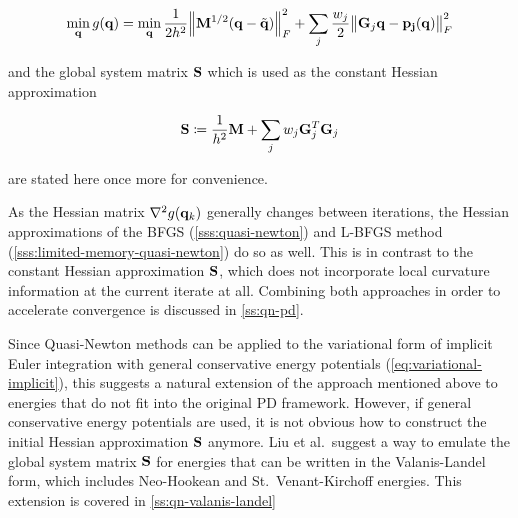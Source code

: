 \begin{equation}\label{eq:pd-minimization-q2}
    \min_{\mathbf{q}} g(\mathbf{q}) = 
    \min_{\mathbf{q}} \frac{1}{2h^2} \norm{\mathbf{M}^{1/2}(\mathbf{q} - \tilde{\mathbf{q}})}^2_F + \sum_j \frac{w_j}{2} \norm{\mathbf{G}_j\mathbf{q}
    - \mathbf{p_j}(\mathbf{q})}^2_F
\end{equation}

\noindent and the global system matrix $\mathbf{S}$ which is used as the constant Hessian approximation

\begin{equation}\label{eq:global-matrix}
    \mathbf{S} \coloneqq \frac{1}{h^2}\mathbf{M} + \sum_j w_j \mathbf{G}_j^T \mathbf{G}_j  
\end{equation}

\noindent are stated here once more for convenience.

As the Hessian matrix $\nabla^2 g(\mathbf{q}_k)$ generally changes between iterations, the Hessian approximations of the 
BFGS (\cref{sss:quasi-newton}) and L-BFGS method (\cref{sss:limited-memory-quasi-newton}) do so as well.
This is in contrast to the constant Hessian approximation $\mathbf{S}$, which does not incorporate local curvature information
at the current iterate at all. Combining both approaches in order to accelerate convergence is discussed 
in \cref{ss:qn-pd}.

Since Quasi-Newton methods can be applied to the variational form of 
implicit Euler integration with general conservative energy potentials (\cref{eq:variational-implicit}), this suggests a 
natural extension of the approach mentioned above to energies that do not fit into the original PD framework. However,
if general conservative energy potentials are used, it is not obvious how to construct the initial Hessian approximation
$\mathbf{S}$ anymore. Liu et al.\ suggest a way to emulate the global system matrix $\mathbf{S}$ for energies that can be written in
the Valanis-Landel form, which includes Neo-Hookean and St.\ Venant-Kirchoff energies. This extension is covered in 
\cref{ss:qn-valanis-landel}

